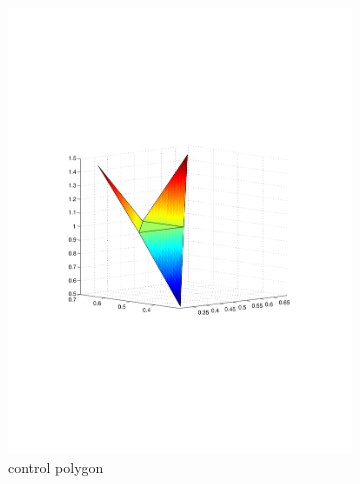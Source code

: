 \begin{figure}[h]
\begin{subfigure}[b]{.5\textwidth}
	\includegraphics[trim=3cm 8cm 3cm 8cm, width=1.\textwidth]{control_polygon2.pdf}
	\caption{control polygon}
\end{subfigure}
\begin{subfigure}[b]{.5\textwidth}

\end{subfigure}
\end{figure}
